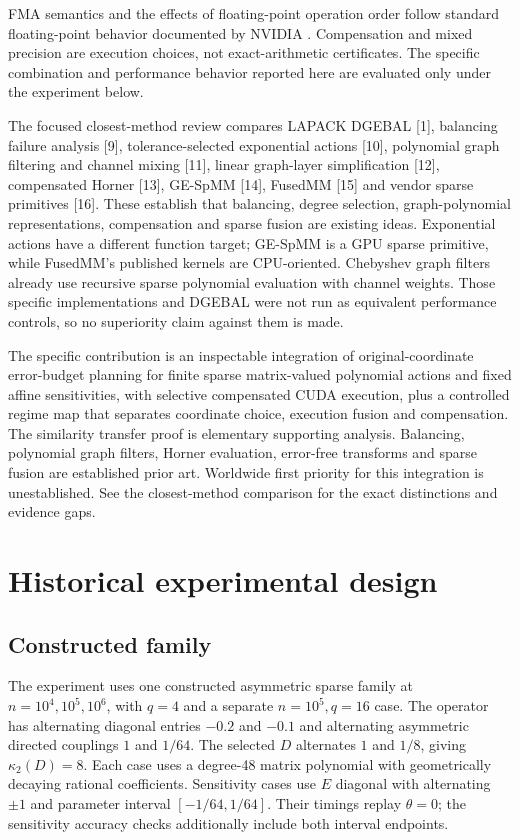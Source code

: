 \documentclass[10pt]{article}
\begin{document}
FMA semantics and the effects of floating-point operation order follow standard floating-point behavior documented by NVIDIA \cite{nvidia}. Compensation and mixed precision are execution choices, not exact-arithmetic certificates. The specific combination and performance behavior reported here are evaluated only under the experiment below.

The focused closest-method review compares LAPACK DGEBAL [1], balancing failure analysis [9], tolerance-selected exponential actions [10], polynomial graph filtering and channel mixing [11], linear graph-layer simplification [12], compensated Horner [13], GE-SpMM [14], FusedMM [15] and vendor sparse primitives [16]. These establish that balancing, degree selection, graph-polynomial representations, compensation and sparse fusion are existing ideas. Exponential actions have a different function target; GE-SpMM is a GPU sparse primitive, while FusedMM's published kernels are CPU-oriented. Chebyshev graph filters already use recursive sparse polynomial evaluation with channel weights. Those specific implementations and DGEBAL were not run as equivalent performance controls, so no superiority claim against them is made.

The specific contribution is an inspectable integration of original-coordinate error-budget planning for finite sparse matrix-valued polynomial actions and fixed affine sensitivities, with selective compensated CUDA execution, plus a controlled regime map that separates coordinate choice, execution fusion and compensation. The similarity transfer proof is elementary supporting analysis. Balancing, polynomial graph filters, Horner evaluation, error-free transforms and sparse fusion are established prior art. Worldwide first priority for this integration is unestablished. See the closest-method comparison for the exact distinctions and evidence gaps.


\section{Historical experimental design}

\subsection{Constructed family}

The experiment uses one constructed asymmetric sparse family at $n=10^4,10^5,10^6$, with $q=4$ and a separate $n=10^5,q=16$ case. The operator has alternating diagonal entries $-0.2$ and $-0.1$ and alternating asymmetric directed couplings $1$ and $1/64$. The selected $D$ alternates $1$ and $1/8$, giving $\kappa_2(D)=8$. Each case uses a degree-48 matrix polynomial with geometrically decaying rational coefficients. Sensitivity cases use $E$ diagonal with alternating $\pm1$ and parameter interval $[-1/64,1/64]$. Their timings replay $\theta=0$; the sensitivity accuracy checks additionally include both interval endpoints.
\end{document}
